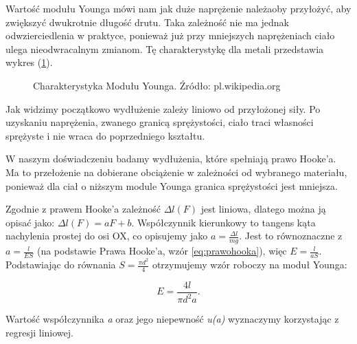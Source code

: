 \documentclass [a4paper,11pt]{article}
\begin{document}
	
	Wartość modułu Younga mówi nam jak duże naprężenie należaoby przyłożyć, aby zwiększyć dwukrotnie długość drutu. Taka zależność nie ma jednak odwzierciedlenia w praktyce, ponieważ już przy mniejszych naprężeniach ciało ulega nieodwracalnym zmianom. Tę charakterystykę dla metali przedstawia wykres (\ref{fig:wykMod}).
	\renewcommand*{\figurename}{Wykres} 
	\setcounter{figure}{0}
	\begin{figure}[!h]
		\begin{center}
		\end{center}
		\caption{Charakterystyka Modułu Younga. Źródło: pl.wikipedia.org}
		\label{fig:wykMod}
	\end{figure}
	Jak widzimy początkowo wydłużenie zależy liniowo od przyłożonej siły. Po uzyskaniu naprężenia, zwanego granicą sprężystości, ciało traci własności sprężyste i nie wraca do poprzedniego kształtu.
	
	W naszym doświadczeniu badamy wydłużenia, które spełniają prawo Hooke'a. Ma to przełożenie na dobierane obciążenie w zależności od wybranego materiału, ponieważ dla ciał o niższym module Younga
	granica sprężystości jest mniejsza. 
	
	Zgodnie z prawem Hooke'a zależność $\Delta l(F)$ jest liniowa, dlatego można ją opisać jako: $\Delta l(F)=aF+b$. Współczynnik kierunkowy to tangens kąta nachylenia prostej do osi OX, co opisujemy jako $a=\frac{\Delta l}{mg}$. Jest to równoznaczne z $a=\frac{l}{ES}$ (na podstawie Prawa Hooke'a, wzór \ref{eq:prawohooka}), więc
	$E=\frac{l}{aS}$. Podstawiając do równania $S=\frac{\pi d^2}{4}$ otrzymujemy wzór roboczy na moduł Younga:
	
	\begin{equation}
	\label{eq:wzorroboczy}
	E = \frac{4l}{\pi d^2 a} \text{.}
	\end{equation}
	
	Wartość współczynnika \textit{a} oraz jego niepewność \textit{u(a)} wyznaczymy korzystając z regresji liniowej.
\end{document}
